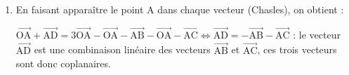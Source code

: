 \documentclass[10pt]{article}
\providecommand{\vect}[1]{\overrightarrow{#1}}
\begin{document}
\begin{enumerate}
La droite $\Delta$ a pour vecteur directeur $\delta\begin{pmatrix}2\\1\\-1\end{pmatrix}$

Soit $\mathcal{P}$ le plan dont on cherche une équation.

$M(x~;~y~;~z) \in \mathcal{P} \iff \vect{\text{C}M} \cdot \delta = 0 \iff 2(x - 0) + 1(y - 1) -1(z - 2) = 0 \iff$

$ 2x + y - 1 - z + 2 = 0 \iff 2x + y - z + 1 = 0$.
\item 







En faisant apparaître le point A dans chaque vecteur (Chasles), on obtient :

$\vect{\text{OA}} + \vect{\text{AD}}  = 3\vect{\text{OA}}  - \vect{\text{OA}}  - \vect{\text{AB}}  - \vect{\text{OA}}  - \vect{\text{AC}} \iff \vect{\text{AD}}  = - \vect{\text{AB}} - \vect{\text{AC}} $ : le vecteur $\vect{\text{AD}}$ est une combinaison linéaire des vecteurs $\vect{\text{AB}}$ et $\vect{\text{AC}}$, ces trois vecteurs sont donc coplanaires.
\end{enumerate}

\bigskip
\end{document}
